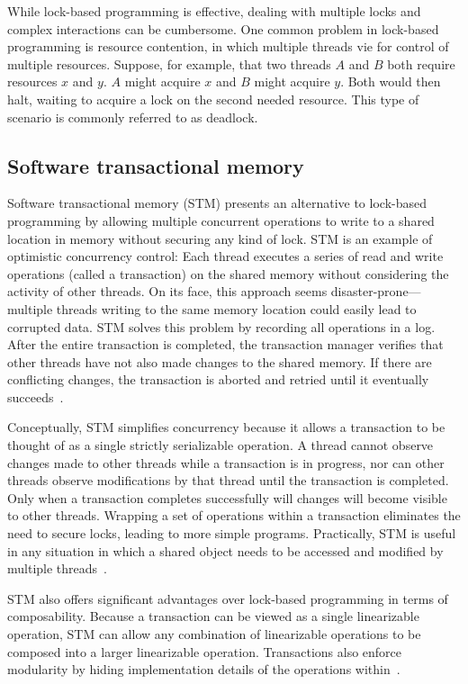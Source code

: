 \documentclass{sig-alternate}
\begin{document}
While lock-based programming is effective, dealing with multiple locks and complex interactions can be cumbersome. One common problem in lock-based programming is resource contention, in which multiple threads vie for control of multiple resources. Suppose, for example, that two threads $A$ and $B$ both require resources $x$ and $y$. $A$ might acquire $x$ and $B$ might acquire $y$. Both would then halt, waiting to acquire a lock on the second needed resource. This type of scenario is commonly referred to as deadlock.

\subsection{Software transactional memory}

Software transactional memory (STM) presents an alternative to lock-based programming by allowing multiple concurrent operations to write to a shared location in memory without securing any kind of lock. STM is an example of optimistic concurrency control: Each thread executes a series of read and write operations (called a transaction) on the shared memory without considering the activity of other threads. On its face, this approach seems disaster-prone---multiple threads writing to the same memory location could easily lead to corrupted data. STM solves this problem by recording all operations in a log. After the entire transaction is completed, the transaction manager verifies that other threads have not also made changes to the shared memory. If there are conflicting changes, the transaction is aborted and retried until it eventually succeeds~\cite{Shavit1995}.

Conceptually, STM simplifies concurrency because it allows a transaction to be thought of as a single strictly serializable operation. A thread cannot observe changes made to other threads while a transaction is in progress, nor can other threads observe modifications by that thread until the transaction is completed. Only when a transaction completes successfully will changes will become visible to other threads. Wrapping a set of operations within a transaction eliminates the need to secure locks, leading to more simple programs. Practically, STM is useful in any situation in which a shared object needs to be accessed and modified by multiple threads~\cite{Swalens2014}.

STM also offers significant advantages over lock-based programming in terms of composability. Because a transaction can be viewed as a single linearizable operation, STM can allow any combination of linearizable operations to be composed into a larger linearizable operation. Transactions also enforce modularity by hiding implementation details of the operations within~\cite{Harris2005}.
\end{document}
